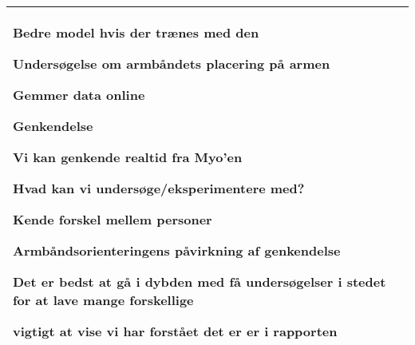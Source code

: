 \begin{center}
\begin{tabular}{| l | p{10cm} |}
\begin{myEnumerate}
\begin{myItemize}
\begin{myItemize}
					\item Bedre model hvis der trænes med den
					\item Undersøgelse om armbåndets placering på armen
					\item Gemmer data online
				\end{myItemize}
				\item Genkendelse
				\begin{myItemize}
					\item Vi kan genkende realtid fra Myo'en
				\end{myItemize}
			\end{myItemize}
			\item Hvad kan vi undersøge/eksperimentere med?
			\begin{myItemize}
				\item Kende forskel mellem personer
				\item Armbåndsorienteringens påvirkning af genkendelse
				\item Det er bedst at gå i dybden med få undersøgelser i stedet for at lave mange forskellige
				\item vigtigt at vise vi har forstået det er er i rapporten
			\end{myItemize}
		\end{myEnumerate}\\ 	
		\hline
	\end{tabular}
\end{center}

